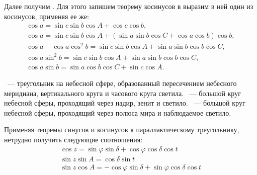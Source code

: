 Далее получим . Для этого запишем теорему косинусов в выразим в ней один из косинусов, применяя ее же:
\begin{gather}
    \cos a = \sin c \sin b \cos A + \cos c \cos b,\nonumber\\
    \cos a = \sin c \sin b \cos A + \left( \sin a \sin b \cos C + \cos a \cos b \right)\cos b,\nonumber\\
    \cos a - \cos a \cos^2 b = \sin c \sin b \cos A + \sin a \sin b \cos b \cos C,\nonumber\\
    \cos a \sin^2 b = \sin c \sin b \cos A + \sin a \sin b \cos b \cos C,\nonumber\\
    \cos a \sin b = \sin a \cos b \cos C + \sin c \cos A.
\end{gather}

~--- треугольник на небесной сфере, образованный пересечением небесного меридиана, вертикального круга и часового круга светила. ~--- большой круг небесной сферы, проходящий через надир, зенит и светило. ~--- большой круг небесной сферы, проходящий через полюса мира и наблюдаемое светило.

Применяя теоремы синусов и косинусов к параллактическому треугольнику, нетрудно получить следующие соотношения:
\begin{gather}
    \cos z=\sin\varphi\sin\delta+\cos\varphi\cos\delta\cos t\\
    \sin z\sin A=\cos\delta\sin t\\
    \sin z\cos A=-\cos\varphi\sin\delta+\sin\varphi\cos\delta\cos t
\end{gather}

